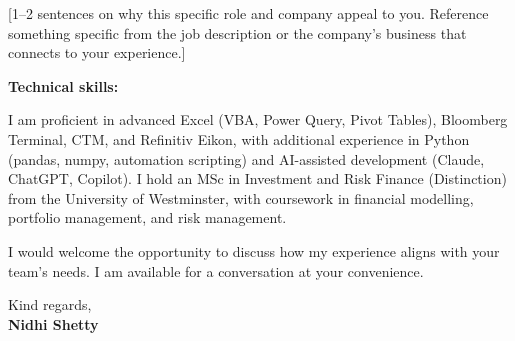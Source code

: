 \documentclass[11pt,a4paper]{article}
\begin{document}
\vspace{2pt}

[1--2 sentences on why this specific role and company appeal to you. Reference something specific from the job description or the company's business that connects to your experience.]

\vspace{6pt}

\textbf{Technical skills:}

\vspace{2pt}

I am proficient in advanced Excel (VBA, Power Query, Pivot Tables), Bloomberg Terminal, CTM, and Refinitiv Eikon, with additional experience in Python (pandas, numpy, automation scripting) and AI-assisted development (Claude, ChatGPT, Copilot). I hold an MSc in Investment and Risk Finance (Distinction) from the University of Westminster, with coursework in financial modelling, portfolio management, and risk management.

\vspace{6pt}

I would welcome the opportunity to discuss how my experience aligns with your team's needs. I am available for a conversation at your convenience.

\vspace{12pt}

Kind regards, \\[4pt]
\textbf{Nidhi Shetty}
\end{document}
